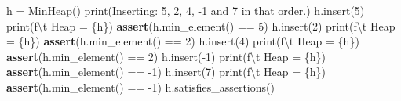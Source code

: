\documentclass[
]{article}
\newenvironment{Shaded}{}{}
\newcommand{\BuiltInTok}[1]{\textcolor[rgb]{0.00,0.50,0.00}{#1}}
\newcommand{\CharTok}[1]{\textcolor[rgb]{0.25,0.44,0.63}{#1}}
\newcommand{\ControlFlowTok}[1]{\textcolor[rgb]{0.00,0.44,0.13}{\textbf{#1}}}
\newcommand{\DecValTok}[1]{\textcolor[rgb]{0.25,0.63,0.44}{#1}}
\newcommand{\NormalTok}[1]{#1}
\newcommand{\OperatorTok}[1]{\textcolor[rgb]{0.40,0.40,0.40}{#1}}
\newcommand{\SpecialCharTok}[1]{\textcolor[rgb]{0.25,0.44,0.63}{#1}}
\newcommand{\SpecialStringTok}[1]{\textcolor[rgb]{0.73,0.40,0.53}{#1}}
\newcommand{\StringTok}[1]{\textcolor[rgb]{0.25,0.44,0.63}{#1}}
\begin{document}
\begin{Shaded}
\begin{Highlighting}[]
\NormalTok{h }\OperatorTok{=}\NormalTok{ MinHeap()}
\BuiltInTok{print}\NormalTok{(}\StringTok{\textquotesingle{}Inserting: 5, 2, 4, {-}1 and 7 in that order.\textquotesingle{}}\NormalTok{)}
\NormalTok{h.insert(}\DecValTok{5}\NormalTok{)}
\BuiltInTok{print}\NormalTok{(}\SpecialStringTok{f\textquotesingle{}}\CharTok{\textbackslash{}t}\SpecialStringTok{ Heap = }\SpecialCharTok{\{}\NormalTok{h}\SpecialCharTok{\}}\SpecialStringTok{\textquotesingle{}}\NormalTok{)}
\ControlFlowTok{assert}\NormalTok{(h.min\_element() }\OperatorTok{==} \DecValTok{5}\NormalTok{)}
\NormalTok{h.insert(}\DecValTok{2}\NormalTok{)}
\BuiltInTok{print}\NormalTok{(}\SpecialStringTok{f\textquotesingle{}}\CharTok{\textbackslash{}t}\SpecialStringTok{ Heap = }\SpecialCharTok{\{}\NormalTok{h}\SpecialCharTok{\}}\SpecialStringTok{\textquotesingle{}}\NormalTok{)}
\ControlFlowTok{assert}\NormalTok{(h.min\_element() }\OperatorTok{==} \DecValTok{2}\NormalTok{)}
\NormalTok{h.insert(}\DecValTok{4}\NormalTok{)}
\BuiltInTok{print}\NormalTok{(}\SpecialStringTok{f\textquotesingle{}}\CharTok{\textbackslash{}t}\SpecialStringTok{ Heap = }\SpecialCharTok{\{}\NormalTok{h}\SpecialCharTok{\}}\SpecialStringTok{\textquotesingle{}}\NormalTok{)}
\ControlFlowTok{assert}\NormalTok{(h.min\_element() }\OperatorTok{==} \DecValTok{2}\NormalTok{)}
\NormalTok{h.insert(}\OperatorTok{{-}}\DecValTok{1}\NormalTok{)}
\BuiltInTok{print}\NormalTok{(}\SpecialStringTok{f\textquotesingle{}}\CharTok{\textbackslash{}t}\SpecialStringTok{ Heap = }\SpecialCharTok{\{}\NormalTok{h}\SpecialCharTok{\}}\SpecialStringTok{\textquotesingle{}}\NormalTok{)}
\ControlFlowTok{assert}\NormalTok{(h.min\_element() }\OperatorTok{==} \OperatorTok{{-}}\DecValTok{1}\NormalTok{)}
\NormalTok{h.insert(}\DecValTok{7}\NormalTok{)}
\BuiltInTok{print}\NormalTok{(}\SpecialStringTok{f\textquotesingle{}}\CharTok{\textbackslash{}t}\SpecialStringTok{ Heap = }\SpecialCharTok{\{}\NormalTok{h}\SpecialCharTok{\}}\SpecialStringTok{\textquotesingle{}}\NormalTok{)}
\ControlFlowTok{assert}\NormalTok{(h.min\_element() }\OperatorTok{==} \OperatorTok{{-}}\DecValTok{1}\NormalTok{)}
\NormalTok{h.satisfies\_assertions()}


\end{Highlighting}
\end{Shaded}
\end{document}
